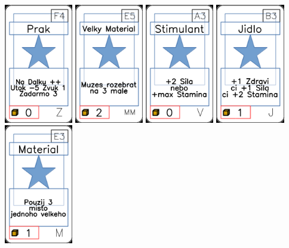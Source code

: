 \documentclass[a4paper]{article}
\begin{document}
	\includegraphics[width=3.0cm]{img-1_88}
	\includegraphics[width=3.0cm]{img-1_54}
	\includegraphics[width=3.0cm]{img-1_62}
	\includegraphics[width=3.0cm]{img-1_7}
	\includegraphics[width=3.0cm]{img-1_52}
\end{document}
